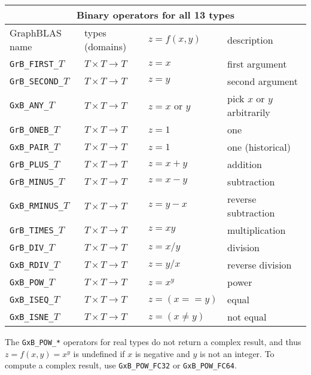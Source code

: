\documentclass[12pt]{article}
\begin{document}
{\vspace{0.2in}
{\footnotesize
\begin{tabular}{|llll|}
\hline
\multicolumn{4}{|c|}{Binary operators for all 13 types} \\
\hline
GraphBLAS name        & types (domains)            & $z=f(x,y)$      & description \\
\hline
\verb'GrB_FIRST_'$T$  & $T \times T \rightarrow T$ & $z = x$         & first argument \\
\verb'GrB_SECOND_'$T$ & $T \times T \rightarrow T$ & $z = y$         & second argument \\
\verb'GxB_ANY_'$T$    & $T \times T \rightarrow T$ & $z = x$ or $y$  & pick $x$ or $y$ arbitrarily \\
\verb'GrB_ONEB_'$T$   & $T \times T \rightarrow T$ & $z = 1$         & one \\
\verb'GxB_PAIR_'$T$   & $T \times T \rightarrow T$ & $z = 1$         & one (historical) \\
\verb'GrB_PLUS_'$T$   & $T \times T \rightarrow T$ & $z = x+y$       & addition \\
\verb'GrB_MINUS_'$T$  & $T \times T \rightarrow T$ & $z = x-y$       & subtraction \\
\verb'GxB_RMINUS_'$T$ & $T \times T \rightarrow T$ & $z = y-x$       & reverse subtraction \\
\verb'GrB_TIMES_'$T$  & $T \times T \rightarrow T$ & $z = xy$        & multiplication \\
\verb'GrB_DIV_'$T$    & $T \times T \rightarrow T$ & $z = x/y$       & division \\
\verb'GxB_RDIV_'$T$   & $T \times T \rightarrow T$ & $z = y/x$       & reverse division \\
\verb'GxB_POW_'$T$    & $T \times T \rightarrow T$ & $z = x^y$       & power \\
\hline
\verb'GxB_ISEQ_'$T$   & $T \times T \rightarrow T$ & $z = (x == y)$  & equal \\
\verb'GxB_ISNE_'$T$   & $T \times T \rightarrow T$ & $z = (x \ne y)$ & not equal \\
\hline
\end{tabular}
}
\vspace{0.2in}

The \verb'GxB_POW_*' operators for real types do not return a complex result,
and thus $z = f(x,y) = x^y$ is undefined if $x$ is negative and $y$ is not an
integer.  To compute a complex result, use \verb'GxB_POW_FC32' or
\verb'GxB_POW_FC64'.

}
\end{document}
